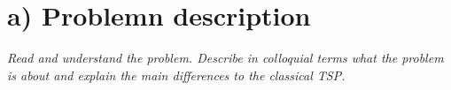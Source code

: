 
\section{a) Problemn description}

\textit{Read and understand the problem. Describe in colloquial terms what the problem
is about and explain the main differences to the classical TSP.}


